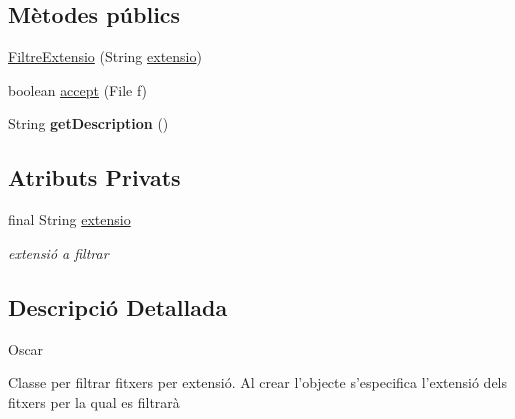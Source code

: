 \subsection*{Mètodes públics}
\begin{DoxyCompactItemize}
\item 
\hyperlink{classlogica_1_1_utils_1_1_filtre_extensio_aa3b372da75e8aef5cbace16c7fbf6e6f}{Filtre\+Extensio} (String \hyperlink{classlogica_1_1_utils_1_1_filtre_extensio_a9b7d1a1892dbf90b13b16970188e1080}{extensio})
\item 
boolean \hyperlink{classlogica_1_1_utils_1_1_filtre_extensio_a079288f12114577638c2036e3fdb51cc}{accept} (File f)
\item 
\hypertarget{classlogica_1_1_utils_1_1_filtre_extensio_ac8ac153602c98c26446f2cfde7aaf9dc}{String {\bfseries get\+Description} ()}\label{classlogica_1_1_utils_1_1_filtre_extensio_ac8ac153602c98c26446f2cfde7aaf9dc}

\end{DoxyCompactItemize}
\subsection*{Atributs Privats}
\begin{DoxyCompactItemize}
\item 
\hypertarget{classlogica_1_1_utils_1_1_filtre_extensio_a9b7d1a1892dbf90b13b16970188e1080}{final String \hyperlink{classlogica_1_1_utils_1_1_filtre_extensio_a9b7d1a1892dbf90b13b16970188e1080}{extensio}}\label{classlogica_1_1_utils_1_1_filtre_extensio_a9b7d1a1892dbf90b13b16970188e1080}

\begin{DoxyCompactList}\small\item\em extensió a filtrar \end{DoxyCompactList}\end{DoxyCompactItemize}


\subsection{Descripció Detallada}
Oscar 

Classe per filtrar fitxers per extensió. Al crear l'objecte s'especifica l'extensió dels fitxers per la qual es filtrarà 

